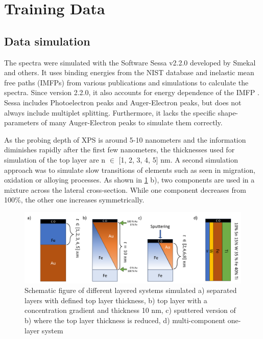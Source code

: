 

\section{Training Data}
\label{train_data}


\subsection{Data simulation}

The spectra were simulated with the Software Sessa v2.2.0 developed by Smekal and others. It uses binding energies from the NIST database and inelastic mean free paths (IMFPs) from various publications and simulations to calculate the spectra. Since version 2.2.0, it also accounts for energy dependence of the IMFP \cite{noauthor_nist_2010}.
Sessa includes Photoelectron peaks and Auger-Electron peaks, but does not always include multiplet splitting. Furthermore, it lacks the specific shape-parameters of many Auger-Electron peaks to simulate them correctly.

As the probing depth of XPS is around 5-10 nanometers and the information diminishes rapidly after the first few nanometers, the thicknesses used for simulation of the top layer are n $\in$ [1, 2, 3, 4, 5] nm. A second simulation approach was to simulate slow transitions of elements such as seen in migration, oxidation or alloying processes. As shown in \ref{fig:layers} b), two components are used in a mixture across the lateral cross-section. While one component decreases from 100\%, the other one increases symmetrically.

\begin{figure}
    \centering
    \includegraphics[width=\textwidth]{Figures/layers.png}
    \caption{Schematic figure of different layered systems simulated a) separated layers with defined top layer thickness, b) top layer with a concentration gradient and thickness 10 nm, c) sputtered version of b) where the top layer thickness is reduced, d) multi-component one-layer system}
    \label{fig:layers}
\end{figure}


